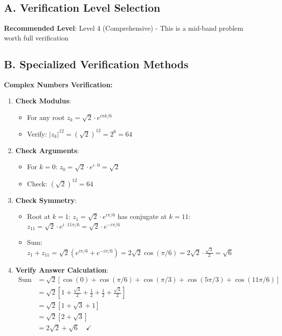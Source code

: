 \documentclass[11pt]{article}
\begin{document}
\begin{verificationbox}
\subsection*{A. Verification Level Selection}

\textbf{Recommended Level}: Level 4 (Comprehensive) - This is a mid-band problem worth full verification

\subsection*{B. Specialized Verification Methods}

\textbf{Complex Numbers Verification:}
\begin{enumerate}[leftmargin=*]
    \item \textbf{Check Modulus}: 
    \begin{itemize}
        \item For any root $z_k = \sqrt{2} \cdot e^{i\pi k/6}$
        \item Verify: $|z_k|^{12} = (\sqrt{2})^{12} = 2^6 = 64$ \checkmark
    \end{itemize}
    
    \item \textbf{Check Arguments}:
    \begin{itemize}
        \item For $k=0$: $z_0 = \sqrt{2} \cdot e^{i \cdot 0} = \sqrt{2}$
        \item Check: $(\sqrt{2})^{12} = 64$ \checkmark
    \end{itemize}
    
    \item \textbf{Check Symmetry}:
    \begin{itemize}
        \item Root at $k=1$: $z_1 = \sqrt{2} \cdot e^{i\pi/6}$ has conjugate at $k=11$: $z_{11} = \sqrt{2} \cdot e^{i \cdot 11\pi/6} = \sqrt{2} \cdot e^{-i\pi/6}$
        \item Sum: $z_1 + z_{11} = \sqrt{2}(e^{i\pi/6} + e^{-i\pi/6}) = 2\sqrt{2}\cos(\pi/6) = 2\sqrt{2} \cdot \frac{\sqrt{3}}{2} = \sqrt{6}$ \checkmark
    \end{itemize}
    
    \item \textbf{Verify Answer Calculation}:
    \begin{align*}
        \text{Sum} &= \sqrt{2}[\cos(0) + \cos(\pi/6) + \cos(\pi/3) + \cos(5\pi/3) + \cos(11\pi/6)] \\
        &= \sqrt{2}[1 + \frac{\sqrt{3}}{2} + \frac{1}{2} + \frac{1}{2} + \frac{\sqrt{3}}{2}] \\
        &= \sqrt{2}[1 + \sqrt{3} + 1] \\
        &= \sqrt{2}[2 + \sqrt{3}] \\
        &= 2\sqrt{2} + \sqrt{6} \quad \checkmark
    \end{align*}
\end{enumerate}


\end{verificationbox}
\end{document}
